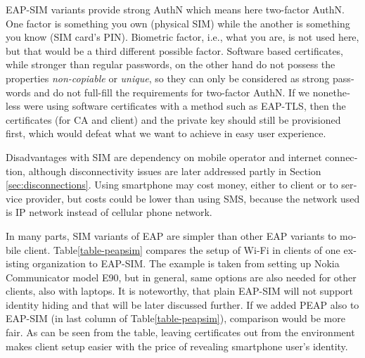\documentclass[12pt,a4paper,english]{tutthesis}
\begin{document}
\begin{otherlanguage}{english}
EAP-SIM variants provide strong AuthN which means here two-factor
AuthN.  One factor  is something you own (physical SIM) while  
the another
is  something you know (SIM card's PIN). Biometric factor, i.e., what you are,
is not used here, but that would be a third different possible factor.
Software based certificates, while stronger than regular passwords,
on the other hand do not possess the properties \emph{non-copiable} or
\emph{unique}, so they can only be considered as strong passwords and 
do not full-fill the requirements for two-factor AuthN.  If we nonetheless
were using software certificates with a method such as EAP-TLS, then the
certificates (for CA and client) and the private key should still be
provisioned first, which would defeat what we want to achieve in
easy user experience.


Disadvantages with SIM are dependency on mobile operator and internet
connection, although disconnectivity issues are later addressed
partly in Section \ref{sec:disconnections}.
Using smartphone may cost money, either to client or to service
provider, but costs could be lower than using SMS, because 
the network  used is IP network instead of cellular phone network.

In many parts, SIM variants of EAP are simpler than other EAP
variants to mobile client.  Table\ref{table-peapsim} compares the setup of Wi-Fi
in clients of one existing organization to EAP-SIM. The example 
is taken from setting up Nokia Communicator model E90, but in general,
same options are also needed for other clients, also with laptops. It
is noteworthy, that plain EAP-SIM will not support identity hiding and
that will be later discussed further. If we added PEAP
also to EAP-SIM (in last column of Table\ref{table-peapsim}), comparison would be more fair.
As can be seen from the table, leaving certificates out from the environment
makes client setup easier with the price of revealing smartphone user's
identity.  




\end{otherlanguage}
\end{document}
